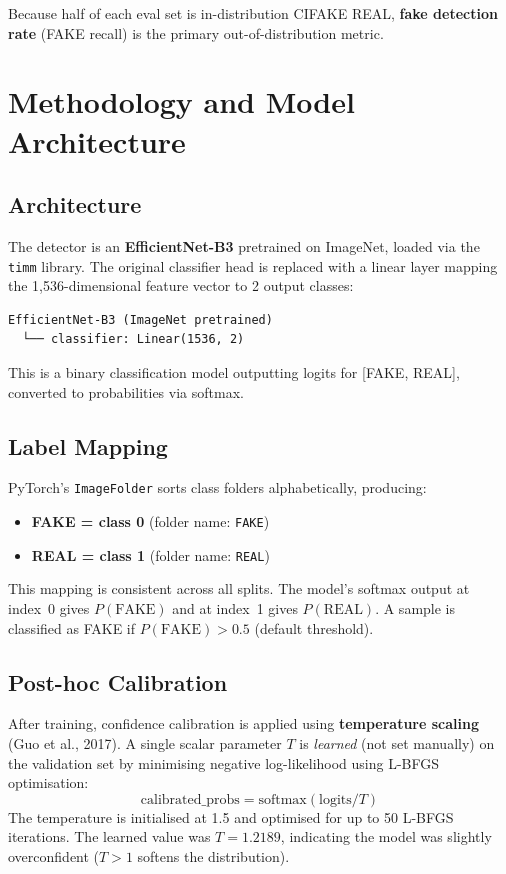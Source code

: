 \documentclass[12pt,a4paper]{article}
\begin{document}
Because half of each eval set is in-distribution CIFAKE REAL, \textbf{fake detection rate} (FAKE recall) is the primary out-of-distribution metric.

\section{Methodology and Model Architecture}

\subsection{Architecture}

The detector is an \textbf{EfficientNet-B3} pretrained on ImageNet, loaded via the \texttt{timm} library. The original classifier head is replaced with a linear layer mapping the 1,536-dimensional feature vector to 2 output classes:

\begin{verbatim}
EfficientNet-B3 (ImageNet pretrained)
  └── classifier: Linear(1536, 2)
\end{verbatim}

This is a binary classification model outputting logits for [FAKE, REAL], converted to probabilities via softmax.

\subsection{Label Mapping}

PyTorch's \texttt{ImageFolder} sorts class folders alphabetically, producing:
\begin{itemize}[noitemsep]
    \item \textbf{FAKE = class 0} (folder name: \texttt{FAKE})
    \item \textbf{REAL = class 1} (folder name: \texttt{REAL})
\end{itemize}
This mapping is consistent across all splits. The model's softmax output at index~0 gives $P(\text{FAKE})$ and at index~1 gives $P(\text{REAL})$. A sample is classified as FAKE if $P(\text{FAKE}) > 0.5$ (default threshold).

\subsection{Post-hoc Calibration}

After training, confidence calibration is applied using \textbf{temperature scaling} (Guo et al., 2017). A single scalar parameter $T$ is \emph{learned} (not set manually) on the validation set by minimising negative log-likelihood using L-BFGS optimisation:
\[
    \text{calibrated\_probs} = \text{softmax}(\text{logits} / T)
\]
The temperature is initialised at 1.5 and optimised for up to 50 L-BFGS iterations. The learned value was $T = 1.2189$, indicating the model was slightly overconfident ($T > 1$ softens the distribution).
\end{document}

